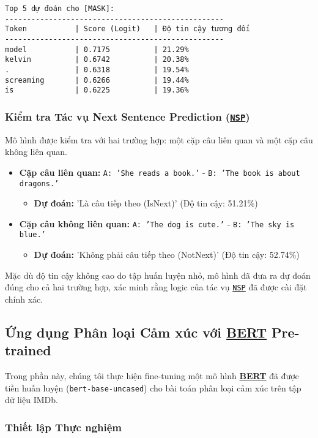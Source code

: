 \begin{verbatim}
Top 5 dự đoán cho [MASK]:
--------------------------------------------------
Token           | Score (Logit)   | Độ tin cậy tương đối
--------------------------------------------------
model           | 0.7175          | 21.29%
kelvin          | 0.6742          | 20.38%
.               | 0.6318          | 19.54%
screaming       | 0.6266          | 19.44%
is              | 0.6225          | 19.36%
\end{verbatim}

\subsubsection{Kiểm tra Tác vụ Next Sentence Prediction (\hyperref[acro:nsp]{\texttt{NSP}})}
Mô hình được kiểm tra với hai trường hợp: một cặp câu liên quan và một cặp câu không liên quan.
\begin{itemize}
    \item \textbf{Cặp câu liên quan:} \texttt{A: 'She reads a book.'} - \texttt{B: 'The book is about dragons.'}
    \begin{itemize}
        \item[] \textbf{Dự đoán:} 'Là câu tiếp theo (IsNext)' (Độ tin cậy: 51.21\%)
    \end{itemize}
    \item \textbf{Cặp câu không liên quan:} \texttt{A: 'The dog is cute.'} - \texttt{B: 'The sky is blue.'}
    \begin{itemize}
        \item[] \textbf{Dự đoán:} 'Không phải câu tiếp theo (NotNext)' (Độ tin cậy: 52.74\%)
    \end{itemize}
\end{itemize}
Mặc dù độ tin cậy không cao do tập huấn luyện nhỏ, mô hình đã đưa ra dự đoán đúng cho cả hai trường hợp, xác minh rằng logic của tác vụ \hyperref[acro:nsp]{\texttt{NSP}} đã được cài đặt chính xác.

\subsection{Ứng dụng Phân loại Cảm xúc với \hyperref[acro:bert]{\textbf{BERT}} Pre-trained}
\label{ssec:phan_loai_cam_xuc}
Trong phần này, chúng tôi thực hiện fine-tuning một mô hình \hyperref[acro:bert]{\textbf{BERT}} đã được tiền huấn luyện (\texttt{bert-base-uncased}) cho bài toán phân loại cảm xúc trên tập dữ liệu IMDb.

\subsubsection{Thiết lập Thực nghiệm}

